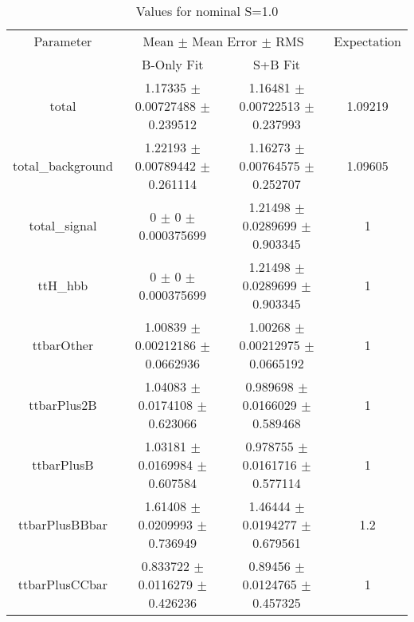 \begin{table}
\centering
\caption{Values for nominal S=1.0}
\begin{tabular}{cccc}
\toprule
Parameter & \multicolumn{2}{c}{Mean $\pm$ Mean Error $\pm$ RMS} & Expectation\\
 & B-Only Fit & S+B Fit & \\
\midrule
total & \num{1.17335} $\pm$ \num{0.00727488} $\pm$ \num{0.239512} & \num{1.16481} $\pm$ \num{0.00722513} $\pm$ \num{0.237993} & \num{1.09219}\\
total\_background & \num{1.22193} $\pm$ \num{0.00789442} $\pm$ \num{0.261114} & \num{1.16273} $\pm$ \num{0.00764575} $\pm$ \num{0.252707} & \num{1.09605}\\
total\_signal & \num{0} $\pm$ \num{0} $\pm$ \num{0.000375699} & \num{1.21498} $\pm$ \num{0.0289699} $\pm$ \num{0.903345} & \num{1}\\
ttH\_hbb & \num{0} $\pm$ \num{0} $\pm$ \num{0.000375699} & \num{1.21498} $\pm$ \num{0.0289699} $\pm$ \num{0.903345} & \num{1}\\
ttbarOther & \num{1.00839} $\pm$ \num{0.00212186} $\pm$ \num{0.0662936} & \num{1.00268} $\pm$ \num{0.00212975} $\pm$ \num{0.0665192} & \num{1}\\
ttbarPlus2B & \num{1.04083} $\pm$ \num{0.0174108} $\pm$ \num{0.623066} & \num{0.989698} $\pm$ \num{0.0166029} $\pm$ \num{0.589468} & \num{1}\\
ttbarPlusB & \num{1.03181} $\pm$ \num{0.0169984} $\pm$ \num{0.607584} & \num{0.978755} $\pm$ \num{0.0161716} $\pm$ \num{0.577114} & \num{1}\\
ttbarPlusBBbar & \num{1.61408} $\pm$ \num{0.0209993} $\pm$ \num{0.736949} & \num{1.46444} $\pm$ \num{0.0194277} $\pm$ \num{0.679561} & \num{1.2}\\
ttbarPlusCCbar & \num{0.833722} $\pm$ \num{0.0116279} $\pm$ \num{0.426236} & \num{0.89456} $\pm$ \num{0.0124765} $\pm$ \num{0.457325} & \num{1}\\
\bottomrule
\end{tabular}
\end{table}